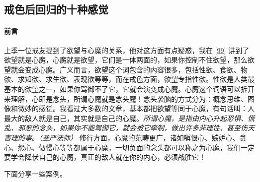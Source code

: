 \subsection{戒色后回归的十种感觉}

\paragraph*{前言}

上季一位戒友提到了欲望与心魔的关系，他对这方面有点疑惑，我在 \ref{99} 讲到了欲望就是心魔，心魔就是欲望，它们是一体两面的，如果你控制不住欲望，那么欲望就会变成心魔。广义而言，欲望这个词包含的内容很多，包括性欲、食欲、物欲、求知欲、求生欲、表现欲等等，而在戒色方面，欲望专指性欲。性欲是人类最基本的欲望之一，如果你驾御不了它，它就会演变成心魔。心魔这个词语可以拆开来理解，心即是念头，所谓心魔就是念头魔！念头袭脑的方式分为：概念思维、图像和微妙的感觉。我看过大多数的文章，基本都把欲望等同于心魔，有句话叫：人最大的敌人就是自己，其实就是自己的心魔。\textit{所谓心魔，是指由内心升起恐惧、慌乱、邪恶的念头，如果你不能驾御它，就会被它牵制，做出许多非理性、甚至伤天害理的事。（圣严法师）} 修行方面，心魔的范畴更广，诸如嗔恨心、嫉妒心、贪心、怨心、傲慢心等等都属于心魔，一切负面的念头都可以称之为心魔，我们一定要学会降伏自己的心魔，真正的敌人就在你的内心，必须战胜它！

下面分享一些案例。

